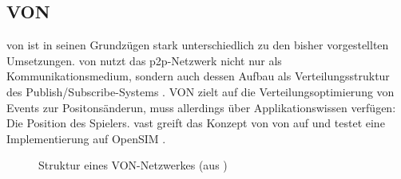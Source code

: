 \subsection{VON}
\label{chap:related:von}
\ac{von} ist in seinen Grundzügen stark unterschiedlich zu den bisher vorgestellten Umsetzungen. \ac{von} nutzt das \ac{p2p}-Netzwerk nicht nur als Kommunikationsmedium, sondern auch dessen Aufbau als Verteilungsstruktur des Publish/Subscribe-Systems \cite{Hu2006VON}. VON zielt auf die Verteilungsoptimierung von Events zur Positonsänderun, muss allerdings über Applikationswissen verfügen: Die Position des Spielers. \ac{vast} \cite{Backhaus2007Voronoibased} greift das Konzept von \ac{von} auf und testet eine Implementierung auf OpenSIM \cite{Baumgart2007OverSim}.

\begin{figure}[htbp]
\centering
{}
\caption{Struktur eines VON-Netzwerkes (aus \cite{Backhaus2007Voronoibased})}
\label{fig:von}
\end{figure}

